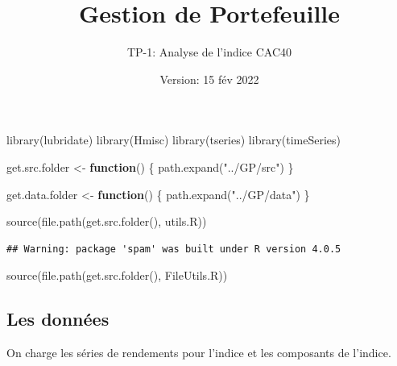 \documentclass[
]{article}
\title{Gestion de Portefeuille}
\subtitle{TP-1: Analyse de l'indice CAC40}
\author{}
\date{\vspace{-2.5em}Version: 15 fév 2022}
\newenvironment{Shaded}{\begin{snugshade}}{\end{snugshade}}
\newcommand{\ControlFlowTok}[1]{\textcolor[rgb]{0.13,0.29,0.53}{\textbf{#1}}}
\newcommand{\FunctionTok}[1]{\textcolor[rgb]{0.00,0.00,0.00}{#1}}
\newcommand{\NormalTok}[1]{#1}
\newcommand{\OtherTok}[1]{\textcolor[rgb]{0.56,0.35,0.01}{#1}}
\newcommand{\StringTok}[1]{\textcolor[rgb]{0.31,0.60,0.02}{#1}}
\begin{document}
\maketitle

\begin{Shaded}
\begin{Highlighting}[]
\FunctionTok{library}\NormalTok{(lubridate)}
\FunctionTok{library}\NormalTok{(Hmisc)}
\FunctionTok{library}\NormalTok{(tseries)}
\FunctionTok{library}\NormalTok{(timeSeries)}


\NormalTok{get.src.folder }\OtherTok{\textless{}{-}} \ControlFlowTok{function}\NormalTok{() \{}
  \FunctionTok{path.expand}\NormalTok{(}\StringTok{"../GP/src"}\NormalTok{)}
\NormalTok{\}}

\NormalTok{get.data.folder }\OtherTok{\textless{}{-}} \ControlFlowTok{function}\NormalTok{() \{}
  \FunctionTok{path.expand}\NormalTok{(}\StringTok{"../GP/data"}\NormalTok{)}
\NormalTok{\}}

\FunctionTok{source}\NormalTok{(}\FunctionTok{file.path}\NormalTok{(}\FunctionTok{get.src.folder}\NormalTok{(), }\StringTok{\textquotesingle{}utils.R\textquotesingle{}}\NormalTok{))}
\end{Highlighting}
\end{Shaded}

\begin{verbatim}
## Warning: package 'spam' was built under R version 4.0.5
\end{verbatim}

\begin{Shaded}
\begin{Highlighting}[]
\FunctionTok{source}\NormalTok{(}\FunctionTok{file.path}\NormalTok{(}\FunctionTok{get.src.folder}\NormalTok{(), }\StringTok{\textquotesingle{}FileUtils.R\textquotesingle{}}\NormalTok{))}
\end{Highlighting}
\end{Shaded}

\hypertarget{les-donnuxe9es}{%
\subsection{Les données}\label{les-donnuxe9es}}

On charge les séries de rendements pour l'indice et les composants de
l'indice.
\end{document}
